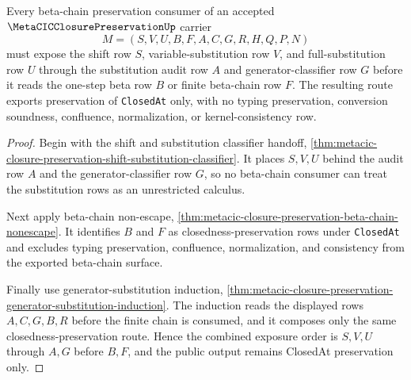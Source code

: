 \begin{theorem}
\label{thm:metacic-closure-preservation-substitution-beta-chain-exposure}
Every beta-chain preservation consumer of an accepted $\MetaCICClosurePreservationUp$ carrier
$$
M=(S,V,U,B,F,A,C,G,R,H,Q,P,N)
$$
must expose the shift row $S$, variable-substitution row $V$, and full-substitution row $U$ through the substitution audit row $A$ and generator-classifier row $G$ before it reads the one-step beta row $B$ or finite beta-chain row $F$. The resulting route exports preservation of \texttt{ClosedAt} only, with no typing preservation, conversion soundness, confluence, normalization, or kernel-consistency row.
\end{theorem}
\begin{proof}
Begin with the shift and substitution classifier handoff,
\autoref{thm:metacic-closure-preservation-shift-substitution-classifier}. It
places $S,V,U$ behind the audit row $A$ and the generator-classifier row $G$,
so no beta-chain consumer can treat the substitution rows as an unrestricted
calculus.

Next apply beta-chain non-escape,
\autoref{thm:metacic-closure-preservation-beta-chain-nonescape}. It identifies
$B$ and $F$ as closedness-preservation rows under \texttt{ClosedAt} and excludes
typing preservation, confluence, normalization, and consistency from the
exported beta-chain surface.

Finally use generator-substitution induction,
\autoref{thm:metacic-closure-preservation-generator-substitution-induction}.
The induction reads the displayed rows $A,C,G,B,R$ before the finite chain is
consumed, and it composes only the same closedness-preservation route. Hence
the combined exposure order is $S,V,U$ through $A,G$ before $B,F$, and the
public output remains ClosedAt preservation only.
\end{proof}

